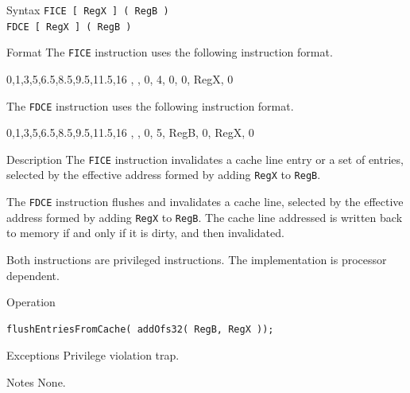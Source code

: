 %
%
\pagebreak
{}

\begin{iPageDescEntry}{Syntax}
	\texttt{FICE [ RegX ] ( RegB )} \\
	\texttt{FDCE [ RegX ] ( RegB )}
\end{iPageDescEntry}

\begin{iPageDescEntry}{Format}
 	The \texttt{FICE} instruction uses the following instruction format. \\
    \begin{flushleft}
    \drawInstrFormat
        {0,1,3,5,6.5,8.5,9.5,11.5,16}
        {\OpCodeGrpSYS, \OpCodePCA, 0, 4, 0, 0, RegX, 0}
    \end{flushleft}
    The \texttt{FDCE} instruction uses the following instruction format. \\
    \begin{flushleft}
    \drawInstrFormat
        {0,1,3,5,6.5,8.5,9.5,11.5,16}
        {\OpCodeGrpSYS, \OpCodePCA, 0, 5, RegB, 0, RegX, 0}
    \end{flushleft}
\end{iPageDescEntry}

\begin{iPageDescEntry}{Description}        
    The \texttt{FICE} instruction invalidates a cache line entry or a set of entries, selected by the effective address formed by adding \texttt{RegX} to \texttt{RegB}. 
    
    The \texttt{FDCE} instruction flushes and invalidates a cache line, selected by the effective address formed by adding \texttt{RegX} to \texttt{RegB}. The cache line addressed is written back to memory if and only if it is dirty, and then invalidated. 

    Both instructions are privileged instructions. The implementation is processor dependent.
\end{iPageDescEntry}

\begin{iPageDescOpEntry}{Operation}
\begin{lstlisting}[style=iPageOpStyle]
flushEntriesFromCache( addOfs32( RegB, RegX ));
\end{lstlisting}
\end{iPageDescOpEntry}

\begin{iPageDescEntry}{Exceptions}
    Privilege violation trap.
\end{iPageDescEntry}

\begin{iPageDescEntry}{Notes}
None.
\end{iPageDescEntry} 
